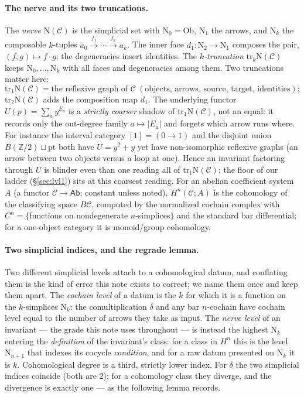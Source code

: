 \documentclass[11pt]{article}
\theoremstyle{definition}
\newcommand{\Ab}{\mathsf{Ab}}
\newcommand{\Ob}{\mathrm{Ob}}
\newcommand{\tr}{\mathrm{tr}}
\newcommand{\Z}{\mathbb{Z}}
\newcommand{\cC}{\mathcal{C}}
\newcommand{\Nerve}{\mathrm{N}}
\begin{document}
\paragraph{The nerve and its two truncations.}
The \emph{nerve} $\Nerve(\cC)$ is the simplicial set with $\Nerve_0=\Ob$, $\Nerve_1$ the arrows, and
$\Nerve_k$ the composable $k$-tuples $a_0\xrightarrow{f_1}\cdots\xrightarrow{f_k}a_k$. The inner face
$d_1\colon\Nerve_2\to\Nerve_1$ composes the pair, $(f,g)\mapsto f\cdot g$; the degeneracies insert
identities. The \emph{$k$-truncation} $\tr_k\Nerve(\cC)$ keeps $\Nerve_0,\dots,\Nerve_k$ with all
faces and degeneracies among them. Two truncations matter here:
\[
   \tr_1\Nerve(\cC)=\text{the reflexive graph of }\cC\ (\text{objects, arrows, source, target,
   identities});
\]
$\tr_2\Nerve(\cC)$ adds the composition map $d_1$. The underlying functor $U(p)=\sum_a y^{E_a}$ is a
\emph{strictly coarser} shadow of $\tr_1\Nerve(\cC)$, not an equal: it records only the out-degree
family $a\mapsto|E_a|$ and forgets which arrow runs where. For instance the interval category
$[1]=(0\to 1)$ and the disjoint union $B(\Z/2)\sqcup\mathrm{pt}$ both have $U=y^2+y$ yet have
non-isomorphic reflexive graphs (an arrow between two objects versus a loop at one). Hence an
invariant factoring through $U$ is blinder even than one reading all of $\tr_1\Nerve(\cC)$; the floor
of our ladder (\S\ref{sec:lvl1}) sits at this coarsest reading. For an abelian coefficient system $A$ (a functor
$\cC\to\Ab$; constant unless noted), $H^n(\cC;A)$ is the cohomology of the classifying space $B\cC$,
computed by the normalized cochain complex with $C^n=\{$functions on nondegenerate $n$-simplices$\}$
and the standard bar differential; for a one-object category it is monoid/group cohomology.

\paragraph{Two simplicial indices, and the regrade lemma.}
Two different simplicial levels attach to a cohomological datum, and conflating them is the kind of
error this note exists to correct; we name them once and keep them apart. The \emph{cochain level} of
a datum is the $k$ for which it is a function on the $k$-simplices $\Nerve_k$: the comultiplication
$\delta$ and any bar $n$-cochain have cochain level equal to the number of arrows they take as input.
The \emph{nerve level} of an invariant --- the grade this note uses throughout --- is instead the
highest $\Nerve_k$ entering the \emph{definition} of the invariant's class: for a class in $H^n$ this
is the level $\Nerve_{n+1}$ that indexes its cocycle \emph{condition}, and for a raw datum presented
on $\Nerve_k$ it is $k$. Cohomological degree is a third, strictly lower index. For $\delta$ the two
simplicial indices coincide (both are $2$); for a cohomology class they diverge, and the divergence is
exactly one --- as the following lemma records.
\end{document}
